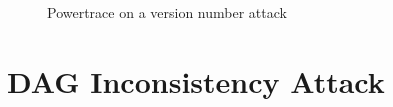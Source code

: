 \documentclass{report}
\begin{document}
\begin{figure}[ht!]
    \centering
    \caption{Powertrace on a version number attack}
\end{figure}





\section{DAG Inconsistency Attack}
\end{document}
